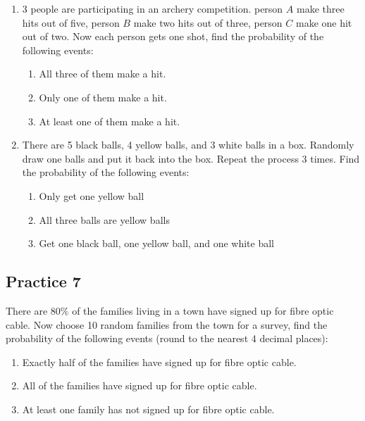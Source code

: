 \documentclass{report}
\begin{document}
\begin{multicols}{2}
\begin{enumerate}
    \item 3 people are participating in an archery competition. person $A$ make three hits out of five, person $B$ make two hits out of three, person $C$ make one hit out of two. Now each person gets one shot, find the probability of the following events:
          \begin{enumerate}
            \item All three of them make a hit.
            \item Only one of them make a hit.
            \item At least one of them make a hit.
          \end{enumerate}

    \item There are 5 black balls, 4 yellow balls, and 3 white balls in a box. Randomly
          draw one balls and put it back into the box. Repeat the process 3 times. Find
          the probability of the following events:
          \begin{enumerate}
            \item Only get one yellow ball
            \item All three balls are yellow balls
            \item Get one black ball, one yellow ball, and one white ball
          \end{enumerate}
  \end{enumerate}

  \subsection{Practice 7}

  There are $80\%$ of the families living in a town have signed up for fibre
  optic cable. Now choose 10 random families from the town for a survey, find the
  probability of the following events (round to the nearest 4 decimal places):

  \begin{enumerate}
    \item Exactly half of the families have signed up for fibre optic cable.

    \item All of the families have signed up for fibre optic cable.

    \item At least one family has not signed up for fibre optic cable.
  \end{enumerate}


\end{multicols}
\end{document}
